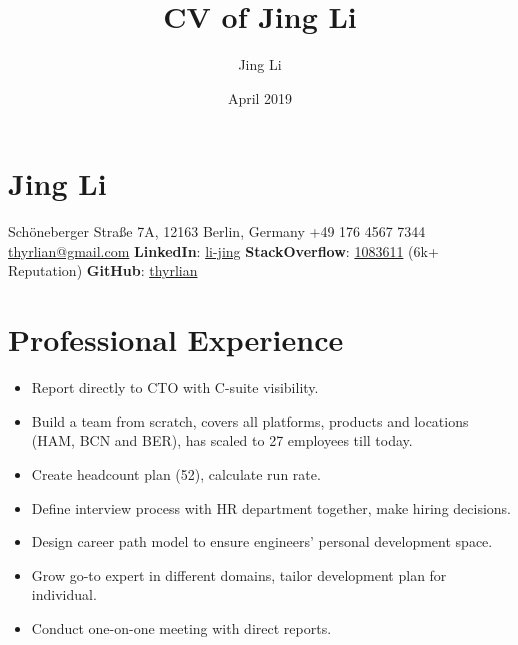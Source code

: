 \documentclass{cv}
\title{CV of Jing Li}
\author{Jing Li}
\date{April 2019}
\begin{document}

\section*{Jing Li}

\begin{itemize}
  \renewcommand{\labelitemi}{}
  \setlength\itemsep{0em}
  \setlength\itemindent{-1em}
  \fancyiconitem{\faHome} Schöneberger Straße 7A, 12163 Berlin, Germany
  \fancyiconitem{\faPhone} +49 176 4567 7344
  \fancyiconitem{\faEnvelope} \href{mailto:thyrlian@gmail.com}{thyrlian@gmail.com}
  \fancyiconitem{\faLinkedin} \textbf{LinkedIn}: \href{https://www.linkedin.com/in/li-jing/}{li-jing}
  \fancyiconitem{\faStackOverflow} \textbf{StackOverflow}: \href{https://stackoverflow.com/users/1083611/jing-li}{1083611} (6k+ Reputation)
  \fancyiconitem{\faGithub} \textbf{GitHub}: \href{https://github.com/thyrlian}{thyrlian}
\end{itemize}

\section*{Professional Experience}


\begin{itemize}
  \setlength\itemsep{0em}
  \item Report directly to CTO with C-suite visibility.
  \item Build a team from scratch, covers all platforms, products and locations (HAM, BCN and BER), has scaled to 27 employees till today.
  \item Create headcount plan (52), calculate run rate.
  \item Define interview process with HR department together, make hiring decisions.
  \item Design career path model to ensure engineers’ personal development space.
  \item Grow go-to expert in different domains, tailor development plan for individual.
  \item Conduct one-on-one meeting with direct reports.
\end{itemize}

\end{document}
